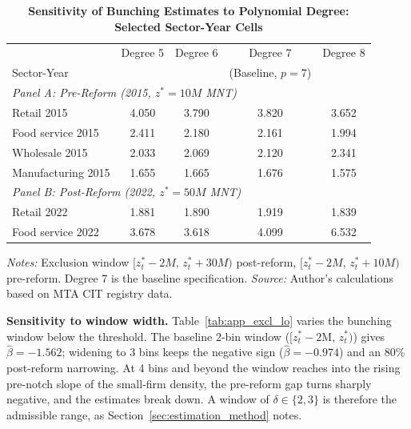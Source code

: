 \documentclass[12pt,oneside,a4paper]{report}
\begin{document}
\begin{table}[H]
\centering
\caption{\textbf{Sensitivity of Bunching Estimates to Polynomial Degree: Selected Sector-Year Cells}}
\label{tab:app_robust_polynomial}
\begin{threeparttable}
\setlength{\tabcolsep}{12pt}
\small
\begin{tabular}{lcccc}
\toprule
 & Degree 5 & Degree 6 & Degree 7 & Degree 8 \\
Sector-Year & & & (Baseline, $p=7$) & \\
\midrule
\multicolumn{5}{l}{\textit{Panel A: Pre-Reform (2015, $z^* = 10M$ MNT)}} \\[2pt]
\quad Retail 2015          & 4.050 & 3.790 & 3.820 & 3.652 \\
\quad Food service 2015    & 2.411 & 2.180 & 2.161 & 1.994 \\
\quad Wholesale 2015       & 2.033 & 2.069 & 2.120 & 2.341 \\
\quad Manufacturing 2015   & 1.655 & 1.665 & 1.676 & 1.575 \\
[6pt]
\multicolumn{5}{l}{\textit{Panel B: Post-Reform (2022, $z^* = 50M$ MNT)}} \\[2pt]
\quad Retail 2022          & 1.881 & 1.890 & 1.919 & 1.839 \\
\quad Food service 2022    & 3.678 & 3.618 & 4.099 & 6.532 \\
\bottomrule
\end{tabular}
\begin{tablenotes}\footnotesize
\item \textit{Notes:} Exclusion window $[z^*_t - 2M,\, z^*_t + 30M)$ post-reform, $[z^*_t - 2M,\, z^*_t + 10M)$ pre-reform.
Degree 7 is the baseline specification.
\textit{Source:} Author's calculations based on MTA CIT registry data.
\end{tablenotes}
\end{threeparttable}
\end{table}

\vspace{1em}
\noindent\textbf{Sensitivity to window width.}
Table~\ref{tab:app_excl_lo} varies the bunching window below the threshold. The baseline 2-bin window ($[z^*_t - 2\text{M},\, z^*_t)$) gives $\hat{\beta} = -1.562$; widening to 3 bins keeps the negative sign ($\hat{\beta} = -0.974$) and an 80\% post-reform narrowing. At 4 bins and beyond the window reaches into the rising pre-notch slope of the small-firm density, the pre-reform gap turns sharply negative, and the estimates break down. A window of $\delta \in \{2,3\}$ is therefore the admissible range, as Section~\ref{sec:estimation_method} notes.
\end{document}
